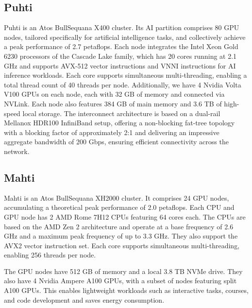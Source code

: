 \subsection{Puhti}
Puhti \cite{puhti} is an Atos BullSequana X400 cluster. Its AI partition comprises 80 GPU nodes, tailored specifically for artificial intelligence tasks, and collectively achieve a peak performance of 2.7 petaflops. Each node integrates the Intel Xeon Gold 6230 processors of the Cascade Lake family, which has 20 cores running at 2.1 GHz and supports AVX-512 vector instructions and VNNI instructions for AI inference workloads. Each core supports simultaneous multi-threading, enabling a total thread count of 40 threads per node. Additionally, we have 4 Nvidia Volta V100 GPUs on each node, each with 32 GB of memory and connected via NVLink. Each node also features 384 GB of main memory and 3.6 TB of high-speed local storage. The interconnect architecture is based on a dual-rail Mellanox HDR100 InfiniBand setup, offering a non-blocking fat-tree topology with a blocking factor of approximately 2:1 and delivering an impressive aggregate bandwidth of 200 Gbps, ensuring efficient connectivity across the network.

\subsection{Mahti}

Mahti \cite{mahti} is an Atos BullSequana XH2000 cluster. It comprises 24 GPU nodes, accumulating a theoretical peak performance of 2.0 petaflops. Each CPU and GPU node has 2 AMD Rome 7H12 CPUs featuring 64 cores each. The CPUs are based on the AMD Zen 2 architecture and operate at a base frequency of 2.6 GHz and a maximum peak frequency of up to 3.3 GHz. They also support the AVX2 vector instruction set. Each core supports simultaneous multi-threading, enabling 256 threads per node.

The GPU nodes have 512 GB of memory and a local 3.8 TB NVMe drive. They also have 4 Nvidia Ampere A100 GPUs, with a subset of nodes featuring split A100 GPUs. This enables lightweight workloads such as interactive tasks, courses, and code development and saves energy consumption.


